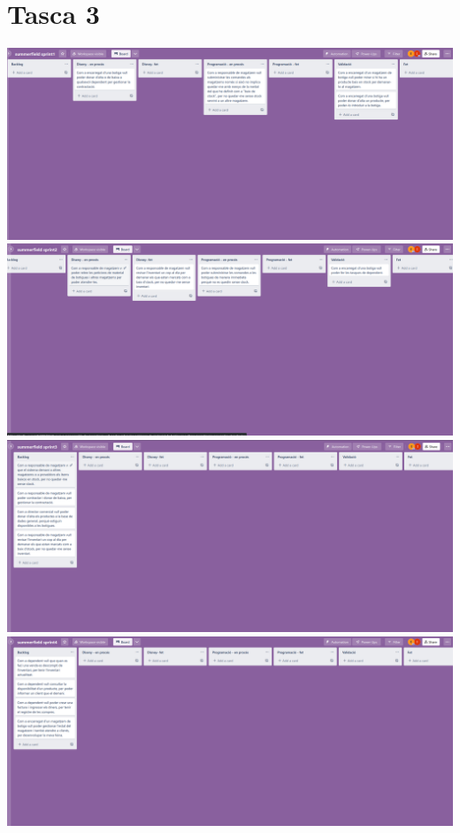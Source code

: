 \documentclass[a4paper,12pt]{article}
\begin{document}
\section{Tasca 3}
\includegraphics[width=\textwidth]{imatges/trello_sprint1.png}
\includegraphics[width=\textwidth]{imatges/trello_sprint2.png}
\includegraphics[width=\textwidth]{imatges/trello_sprint3.png}
\includegraphics[width=\textwidth]{imatges/trello_sprint4.png}
\end{document}
